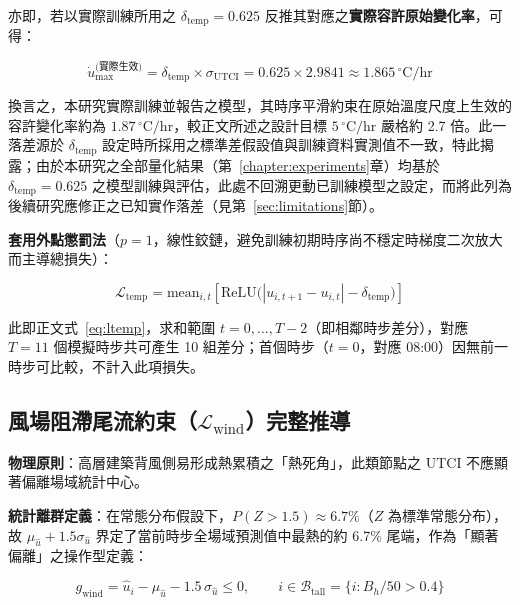 亦即，若以實際訓練所用之 $\delta_{\text{temp}} = 0.625$ 反推其對應之\textbf{實際容許原始變化率}，可得：

\begin{equation}
    \dot{u}_{\text{max}}^{\text{(實際生效)}} = \delta_{\text{temp}} \times \sigma_{\text{UTCI}} = 0.625 \times 2.9841 \approx 1.865\,^\circ\text{C/hr}
\end{equation}

換言之，本研究實際訓練並報告之模型，其時序平滑約束在原始溫度尺度上生效的容許變化率約為 $1.87\,^\circ\text{C/hr}$，較正文所述之設計目標 $5\,^\circ\text{C/hr}$ 嚴格約 2.7 倍。此一落差源於 $\delta_{\text{temp}}$ 設定時所採用之標準差假設值與訓練資料實測值不一致，特此揭露；由於本研究之全部量化結果（第~\ref{chapter:experiments}章）均基於 $\delta_{\text{temp}}=0.625$ 之模型訓練與評估，此處不回溯更動已訓練模型之設定，而將此列為後續研究應修正之已知實作落差（見第~\ref{sec:limitations}節）。

\noindent\textbf{套用外點懲罰法}（$p=1$，線性鉸鏈，避免訓練初期時序尚不穩定時梯度二次放大而主導總損失）：

\begin{equation}
    \mathcal{L}_{\text{temp}} = \text{mean}_{i,t}\!\left[\text{ReLU}\big(|u_{i,t+1} - u_{i,t}| - \delta_{\text{temp}}\big)\right]
\end{equation}

此即正文式~\eqref{eq:ltemp}，求和範圍 $t=0,\ldots,T-2$（即相鄰時步差分），對應 $T=11$ 個模擬時步共可產生 10 組差分；首個時步（$t=0$，對應 08:00）因無前一時步可比較，不計入此項損失。

\subsection{風場阻滯尾流約束（$\mathcal{L}_{\text{wind}}$）完整推導}

\noindent\textbf{物理原則}：高層建築背風側易形成熱累積之「熱死角」，此類節點之 UTCI 不應顯著偏離場域統計中心。

\noindent\textbf{統計離群定義}：在常態分布假設下，$P(Z > 1.5) \approx 6.7\%$（$Z$ 為標準常態分布），故 $\mu_{\hat{u}} + 1.5\sigma_{\hat{u}}$ 界定了當前時步全場域預測值中最熱的約 6.7\% 尾端，作為「顯著偏離」之操作型定義：

\begin{equation}
    g_{\text{wind}} = \hat{u}_i - \mu_{\hat{u}} - 1.5\,\sigma_{\hat{u}} \le 0,
    \qquad i \in \mathcal{B}_{\text{tall}} = \{i : B_h/50 > 0.4\}
\end{equation}


